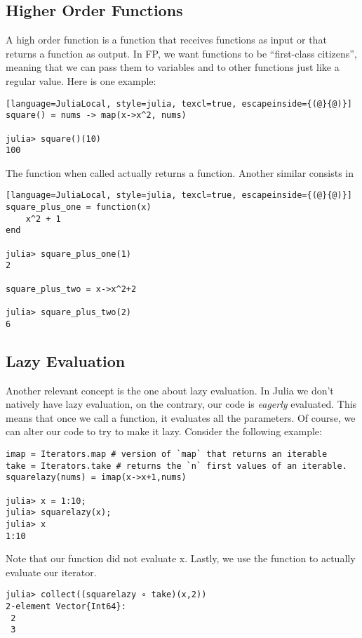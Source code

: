 \subsection{Higher Order Functions}

A high order function is a function that receives functions as input or that returns a function as output.
In FP, we want functions to be ``first-class citizens'', meaning that we can pass them to variables and to other
functions just like a regular value.
Here is one example:

\bigskip
\begin{lstlisting}[language=JuliaLocal, style=julia, texcl=true, escapeinside={(@}{@)}]
square() = nums -> map(x->x^2, nums)

julia> square()(10)
100
\end{lstlisting}

The function  when called actually returns a function.
Another similar consists in
\bigskip
\begin{lstlisting}[language=JuliaLocal, style=julia, texcl=true, escapeinside={(@}{@)}]
square_plus_one = function(x)
    x^2 + 1
end

julia> square_plus_one(1)
2

square_plus_two = x->x^2+2

julia> square_plus_two(2)
6
\end{lstlisting}

\subsection{Lazy Evaluation}

Another relevant concept is the one about lazy evaluation.
In Julia we don't natively have lazy evaluation, on the contrary,
our code is \textit{eagerly} evaluated.
This means that once we call a function, it evaluates all the parameters.
Of course, we can alter our code to try to make it lazy. Consider the following example:

\bigskip
\begin{lstlisting}[language=JuliaLocal, style=julia, texcl=true]
imap = Iterators.map # version of `map` that returns an iterable
take = Iterators.take # returns the `n` first values of an iterable.
squarelazy(nums) = imap(x->x+1,nums)

julia> x = 1:10;
julia> squarelazy(x);
julia> x
1:10
\end{lstlisting}

Note that our function did not evaluate x. Lastly, we use the 
function to actually evaluate our iterator.
\bigskip
\begin{lstlisting}[language=JuliaLocal, style=julia, texcl=true]
julia> collect((squarelazy ∘ take)(x,2))
2-element Vector{Int64}:
 2
 3
\end{lstlisting}

